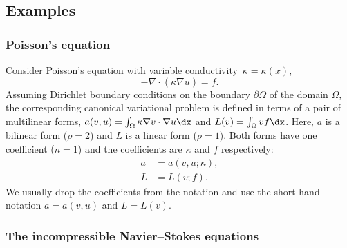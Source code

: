 \subsection{Examples}

\subsubsection{Poisson's equation}

Consider Poisson's equation with variable conductivity~$\kappa =
\kappa(x)$,
\begin{displaymath}
  -\nabla \cdot (\kappa \nabla u) = f.
\end{displaymath}
Assuming Dirichlet boundary conditions on the boundary
$\partial\Omega$ of the domain $\Omega$, the corresponding canonical
variational problem is defined in terms of a pair of multilinear
forms, $a(v, u) = \int_{\Omega} \kappa \nabla v \cdot \nabla u \dx$
and $L(v) = \int_{\Omega} v f \dx$. Here, $a$ is a bilinear form
($\rho = 2$) and $L$ is a linear form ($\rho = 1$). Both forms have
one coefficient ($n = 1$) and the coefficients are $\kappa$ and $f$
respectively:
\begin{displaymath}
  \begin{split}
    a &= a(v, u; \kappa), \\
    L &= L(v; f).
  \end{split}
\end{displaymath}
We usually drop the coefficients from the notation and use the
short-hand notation $a = a(v, u)$ and $L = L(v)$.

\subsubsection{The incompressible Navier--Stokes equations}


